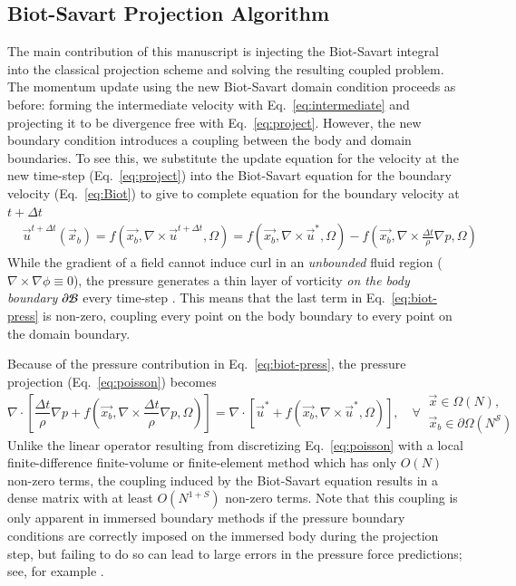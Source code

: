 \documentclass[final,1p,times]{elsarticle}
\begin{document}
\subsection{Biot-Savart Projection Algorithm}\label{sec:Biot_projection}

The main contribution of this manuscript is injecting the Biot-Savart integral into the classical projection scheme and solving the resulting coupled problem. The momentum update using the new Biot-Savart domain condition proceeds as before: forming the intermediate velocity with Eq.~\ref{eq:intermediate} and projecting it to be divergence free with Eq.~\ref{eq:project}. However, the new boundary condition introduces a coupling between the body and domain boundaries. To see this, we substitute the update equation for the velocity at the new time-step (Eq.~\ref{eq:project}) into the Biot-Savart equation for the boundary velocity (Eq.~\ref{eq:Biot}) to give to complete equation for the boundary velocity at $t+\Delta t$
\begin{align}\label{eq:biot-press}
    &\vec{u}^{t+\Delta t}(\vec x_b) = f(\vec{x_b},\nabla\times \vec{u}^{t+\Delta t},\Omega) = f(\vec{x_b},\nabla\times\vec{u}^*,\Omega)-f\left(\vec{x_b},\nabla\times\frac{\Delta t}{\rho}\nabla p,\Omega\right) 
\end{align}
While the gradient of a field cannot induce curl in an \textit{unbounded} fluid region ($\nabla\times\nabla\phi\equiv 0$), the pressure generates a thin layer of vorticity \textit{on the body boundary} $\partial\cal B$ every time-step \cite{Morton1984GeophysicalTy}. This means that the last term in Eq.~\ref{eq:biot-press} is non-zero, coupling every point on the body boundary to every point on the domain boundary.

Because of the pressure contribution in Eq.~\ref{eq:biot-press}, the pressure projection (Eq.~\ref{eq:poisson}) becomes
\begin{equation}\label{eq:complex_poisson}
    \nabla\cdot\left[\frac{\Delta t}{\rho}\nabla p + f\left(\vec{x_b},\nabla\times\frac{\Delta t}{\rho}\nabla p,\Omega\right)\right] = \nabla\cdot\left[ \vec{u}^* + f(\vec{x_b},\nabla\times\vec{u}^*,\Omega)\right], \quad\forall\
    \begin{array}{l}
    \vec{x} \in \Omega(N),\\
    \vec{x}_b \in \partial\Omega(N^\mathcal{S})
    \end{array}
\end{equation}
Unlike the linear operator resulting from discretizing Eq.~\ref{eq:poisson} with a local finite-difference finite-volume or finite-element method which has only $O(N)$ non-zero terms, the coupling induced by the Biot-Savart equation results in a dense matrix with at least $O(N^{1+S})$ non-zero terms. Note that this coupling is only apparent in immersed boundary methods if the pressure boundary conditions are correctly imposed on the immersed body during the projection step, but failing to do so can lead to large errors in the pressure force predictions; see, for example \cite{Taira2007, Lauber2022}.
\end{document}
